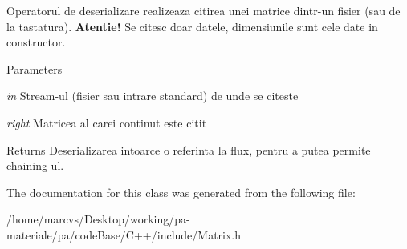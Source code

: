 Operatorul de deserializare realizeaza citirea unei matrice dintr-\/un fisier (sau de la tastatura). {\bfseries  Atentie!} Se citesc doar datele, dimensiunile sunt cele date in constructor. 


\begin{DoxyParams}{Parameters}
\item[{\em in}]Stream-\/ul (fisier sau intrare standard) de unde se citeste \item[{\em right}]Matricea al carei continut este citit \end{DoxyParams}
\begin{DoxyReturn}{Returns}
Deserializarea intoarce o referinta la flux, pentru a putea permite chaining-\/ul. 
\end{DoxyReturn}


The documentation for this class was generated from the following file:\begin{DoxyCompactItemize}
\item 
/home/marcvs/Desktop/working/pa-\/materiale/pa/codeBase/C++/include/Matrix.h\end{DoxyCompactItemize}
